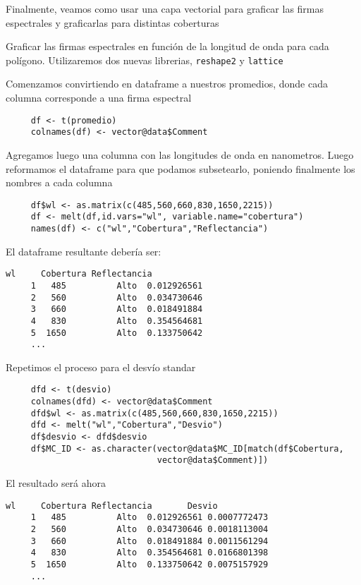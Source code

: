 Finalmente, veamos como usar una capa vectorial para graficar las
firmas espectrales y graficarlas para distintas coberturas

\begin{exa}
     Graficar las firmas espectrales en funci\'on de la longitud de onda para cada
     pol\'igono. Utilizaremos dos nuevas librerias,
     \texttt{reshape2} y \texttt{lattice}

     Comenzamos convirtiendo en dataframe a nuestros promedios, donde cada
     columna corresponde a una firma espectral
     \begin{lstlisting}
     df <- t(promedio)
     colnames(df) <- vector@data$Comment
     \end{lstlisting}
     Agregamos luego una columna con las longitudes de onda en nanometros. Luego
     reformamos el dataframe para que podamos subsetearlo, poniendo finalmente
     los nombres a cada columna
     \begin{lstlisting}
     df$wl <- as.matrix(c(485,560,660,830,1650,2215))
     df <- melt(df,id.vars="wl", variable.name="cobertura")
     names(df) <- c("wl","Cobertura","Reflectancia")
     \end{lstlisting}
     El dataframe resultante deber\'ia ser:
     \begin{Verbatim}[fontsize=\small]
          wl     Cobertura Reflectancia
     1   485          Alto  0.012926561
     2   560          Alto  0.034730646
     3   660          Alto  0.018491884
     4   830          Alto  0.354564681
     5  1650          Alto  0.133750642
     ...
     \end{Verbatim}
     Repetimos el proceso para el desv\'io standar
     \begin{lstlisting}
     dfd <- t(desvio)
     colnames(dfd) <- vector@data$Comment
     dfd$wl <- as.matrix(c(485,560,660,830,1650,2215))
     dfd <- melt("wl","Cobertura","Desvio")
     df$desvio <- dfd$desvio
     df$MC_ID <- as.character(vector@data$MC_ID[match(df$Cobertura,
                              vector@data$Comment)])
     \end{lstlisting}
     El resultado ser\'a ahora
     \begin{Verbatim}[fontsize=\small]
          wl     Cobertura Reflectancia       Desvio
     1   485          Alto  0.012926561 0.0007772473
     2   560          Alto  0.034730646 0.0018113004
     3   660          Alto  0.018491884 0.0011561294
     4   830          Alto  0.354564681 0.0166801398
     5  1650          Alto  0.133750642 0.0075157929
     ...
     \end{Verbatim}

\end{exa}
